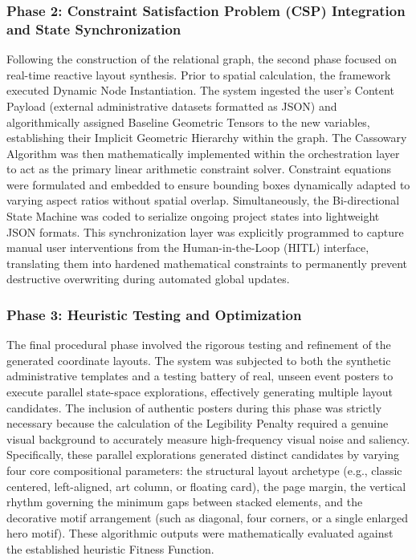 \begin{refsection}
\subsubsection{Phase 2: Constraint Satisfaction Problem (CSP) Integration and State Synchronization}
Following the construction of the relational graph, the second phase focused on real-time reactive layout synthesis. Prior to spatial calculation, the framework executed Dynamic Node Instantiation. The system ingested the user's Content Payload (external administrative datasets formatted as JSON) and algorithmically assigned Baseline Geometric Tensors to the new variables, establishing their Implicit Geometric Hierarchy within the graph. The Cassowary Algorithm was then mathematically implemented within the orchestration layer to act as the primary linear arithmetic constraint solver. Constraint equations were formulated and embedded to ensure bounding boxes dynamically adapted to varying aspect ratios without spatial overlap. Simultaneously, the Bi-directional State Machine was coded to serialize ongoing project states into lightweight JSON formats. This synchronization layer was explicitly programmed to capture manual user interventions from the Human-in-the-Loop (HITL) interface, translating them into hardened mathematical constraints to permanently prevent destructive overwriting during automated global updates.

\subsubsection{Phase 3: Heuristic Testing and Optimization}
The final procedural phase involved the rigorous testing and refinement of the generated coordinate layouts. The system was subjected to both the synthetic administrative templates and a testing battery of real, unseen event posters to execute parallel state-space explorations, effectively generating multiple layout candidates. The inclusion of authentic posters during this phase was strictly necessary because the calculation of the Legibility Penalty required a genuine visual background to accurately measure high-frequency visual noise and saliency. Specifically, these parallel explorations generated distinct candidates by varying four core compositional parameters: the structural layout archetype (e.g., classic centered, left-aligned, art column, or floating card), the page margin, the vertical rhythm governing the minimum gaps between stacked elements, and the decorative motif arrangement (such as diagonal, four corners, or a single enlarged hero motif). These algorithmic outputs were mathematically evaluated against the established heuristic Fitness Function. 


\end{refsection}
